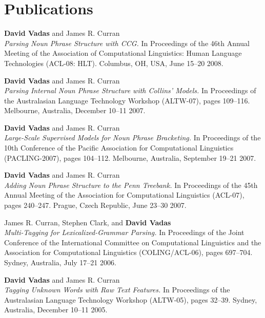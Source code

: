 \documentclass[]{article}
\begin{document}
\newpage

\section*{Publications}

\textbf{David Vadas} and James R. Curran\\
\textit{Parsing Noun Phrase Structure with {CCG}.}
In Proceedings of the 46th Annual Meeting of the Association of Computational
Linguistics: Human Language Technologies (ACL-08: HLT).
Columbus, OH, USA, June 15--20 2008.

\vbox{}

\textbf{David Vadas} and James R. Curran\\
\textit{Parsing Internal Noun Phrase Structure with Collins' Models.}
In Proceedings of the Australasian Language Technology 
Workshop (ALTW-07), pages 109--116. Melbourne, Australia, December 10--11 2007.

\vbox{}

\textbf{David Vadas} and James R. Curran\\
\textit{Large-Scale Supervised Models for Noun Phrase Bracketing.}
In Proceedings of the 10th Conference of the Pacific Association for 
Computational Linguistics (PACLING-2007), pages 104--112. 
Melbourne, Australia, September 19--21 2007.

\vbox{}

\textbf{David Vadas} and James R. Curran\\
\textit{Adding Noun Phrase Structure to the Penn Treebank.} In
Proceedings of the 45th Annual Meeting of the Association for Computational 
Linguistics (ACL-07), pages 240--247. Prague, Czech Republic, June 23--30 2007. \\
 
\vbox{}

James R. Curran, Stephen Clark, and \textbf{David Vadas}\\
\textit{Multi-Tagging for Lexicalized-Grammar Parsing.} In
Proceedings of the Joint Conference of the International Committee on
Computational Linguistics and the Association for Computational Linguistics
(COLING/ACL-06), pages 697--704. Sydney, Australia, July 17--21 2006. \\  

\vbox{}

\textbf{David Vadas} and James R. Curran\\
\textit{Tagging Unknown Words with Raw Text Features.} In Proceedings of the
Australasian Language Technology Workshop (ALTW-05), pages 32--39.
Sydney, Australia, December 10--11 2005. \\  
\end{document}
